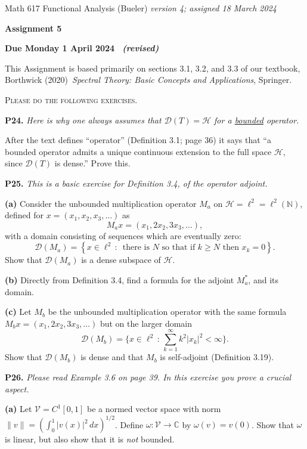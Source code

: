 \documentclass[12pt]{amsart}
\newcommand{\cD}{\mathcal{D}}
\newcommand{\cH}{\mathcal{H}}
\newcommand{\cV}{\mathcal{V}}
\newcommand{\CC}{\mathbb{C}}
\newcommand{\NN}{\mathbb{N}}
\newcommand{\prob}[1]{\bigskip\noindent\textbf{#1.}\quad }
\newcommand{\epart}[1]{\medskip\noindent\textbf{(#1)}\quad }
\begin{document}
\scriptsize \noindent Math 617 Functional Analysis (Bueler) \hfill \emph{version 4; assigned 18 March 2024}
\normalsize\medskip

\Large\centerline{\textbf{Assignment 5}}
\large
\medskip

\centerline{\textbf{Due Monday 1 April 2024 \, \emph{(revised)}}}
\medskip
\normalsize

\thispagestyle{empty}

\bigskip
\noindent This Assignment is based primarily on sections 3.1, 3.2, and 3.3 of our textbook, Borthwick (2020)~\emph{Spectral Theory: Basic Concepts and Applications}, Springer.

\medskip
\noindent \textsc{Please do the following exercises.}
\smallskip


\prob{P24}  \emph{Here is why one always assumes that $\cD(T) = \cH$ for a \underline{bounded} operator.}

\medskip \noindent After the text defines ``operator'' (Definition 3.1; page 36) it says that ``a bounded operator admits a unique continuous extension to the full space $\cH$, since $\cD(T)$ is dense.''  Prove this.


\prob{P25}  \emph{This is a basic exercise for Definition 3.4, of the operator adjoint.}

\epart{a} Consider the unbounded multiplication operator $M_a$ on $\cH=\ell^2=\ell^2(\NN)$, defined for $x=(x_1,x_2,x_3,\dots)$ as
	$$M_a x = (x_1, 2 x_2, 3 x_3, \dots),$$
with a domain consisting of sequences which are eventually zero:
	$$\cD(M_a) = \left\{x \in \ell^2\,:\,\text{ there is $N$ so that if $k\ge N$ then } x_k=0\right\}.$$
Show that $\cD(M_a)$ is a dense subspace of $\cH$.

\epart{b} Directly from Definition 3.4, find a formula for the adjoint $M_a^*$, and its domain.

\epart{c} Let $M_b$ be the unbounded multiplication operator with the same formula $M_b x = (x_1, 2 x_2, 3 x_3, \dots)$ but on the larger domain
    $$\cD(M_b) = \Big\{x \in \ell^2\,:\, \sum_{k=1}^\infty k^2 |x_k|^2 < \infty\Big\}.$$
Show that $\cD(M_b)$ is dense and that $M_b$ is self-adjoint (Definition 3.19).


\prob{P26}  \emph{Please read Example 3.6 on page 39.  In this exercise you prove a crucial aspect.}

\epart{a} Let $\cV = C^1[0,1]$ be a normed vector space with norm $\|v\| = \left(\int_0^1 |v(x)|^2\,dx\right)^{1/2}$.  Define $\omega: \cV \to \CC$ by $\omega(v) = v(0)$.  Show that $\omega$ is linear, but also show that it is \emph{not} bounded.
\end{document}
